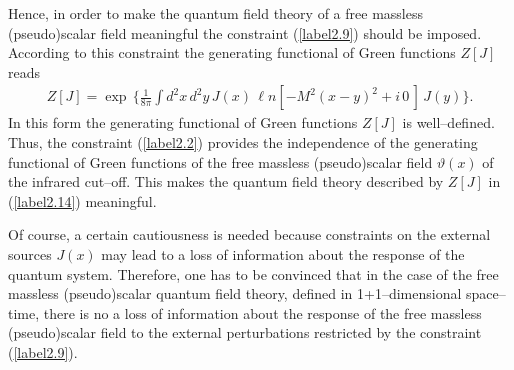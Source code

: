 \documentclass[a4paper,12pt] {article}
\begin{document}
Hence, in order to make the quantum field theory of a free massless
(pseudo)scalar field meaningful the constraint (\ref{label2.9}) should
be imposed. According to this constraint the generating functional of
Green functions $Z[J]$ reads
%
\begin{eqnarray}\label{label2.14}
Z[J] = \exp\,\Big\{\frac{1}{8\pi}\int d^2x\,d^2y\,J(x)\,{\ell
n}[-M^2(x-y)^2 + i\,0\,]\,J(y)\Big\}.
\end{eqnarray}
%
In this form the generating functional of Green functions $Z[J]$ is
well--defined. Thus, the constraint (\ref{label2.2}) provides the
independence of the generating functional of Green functions of the
free massless (pseudo)scalar field $\vartheta(x)$ of the infrared
cut--off. This makes the quantum field theory described by $Z[J]$ in
(\ref{label2.14}) meaningful.

Of course, a certain cautiousness is needed because constraints on the
external sources $J(x)$ may lead to a loss of information about the
response of the quantum system. Therefore, one has to be convinced
that in the case of the free massless (pseudo)scalar quantum field
theory, defined in 1+1--dimensional space--time, there is no a loss of
information about the response of the free massless (pseudo)scalar
field to the external perturbations restricted by the constraint
(\ref{label2.9}).
\end{document}
